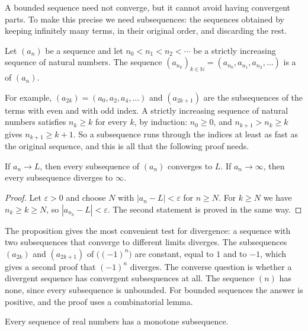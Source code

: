 A bounded sequence need not converge, but it cannot avoid having convergent parts. To make this precise we need subsequences: the sequences obtained by keeping infinitely many terms, in their original order, and discarding the rest.

\begin{definition}[Subsequence]
\label{def:subsequence}
Let $(a_n)$ be a sequence and let $n_0<n_1<n_2<\cdots$ be a strictly increasing sequence of natural numbers. The sequence $(a_{n_k})_{k\in\mathbb N}=(a_{n_0},a_{n_1},a_{n_2},\ldots)$ is a  of $(a_n)$.
\end{definition}

For example, $(a_{2k})=(a_0,a_2,a_4,\ldots)$ and $(a_{2k+1})$ are the subsequences of the terms with even and with odd index. A strictly increasing sequence of natural numbers satisfies $n_k\ge k$ for every $k$, by induction: $n_0\ge0$, and $n_{k+1}>n_k\ge k$ gives $n_{k+1}\ge k+1$. So a subsequence runs through the indices at least as fast as the original sequence, and this is all that the following proof needs.

\begin{proposition}
\label{prop:subsequence}
If $a_n\to L$, then every subsequence of $(a_n)$ converges to $L$. If $a_n\to\infty$, then every subsequence diverges to $\infty$.
\end{proposition}

\begin{proof}
Let $\varepsilon>0$ and choose $N$ with $|a_n-L|<\varepsilon$ for $n\ge N$. For $k\ge N$ we have $n_k\ge k\ge N$, so $|a_{n_k}-L|<\varepsilon$. The second statement is proved in the same way.
\end{proof}

The proposition gives the most convenient test for divergence: a sequence with two subsequences that converge to different limits diverges. The subsequences $(a_{2k})$ and $(a_{2k+1})$ of $\bigl((-1)^n\bigr)$ are constant, equal to $1$ and to $-1$, which gives a second proof that $(-1)^n$ diverges. The converse question is whether a divergent sequence has convergent subsequences at all. The sequence $(n)$ has none, since every subsequence is unbounded. For bounded sequences the answer is positive, and the proof uses a combinatorial lemma.

\begin{lemma}
\label{lem:monotone-subsequence}
Every sequence of real numbers has a monotone subsequence.
\end{lemma}

